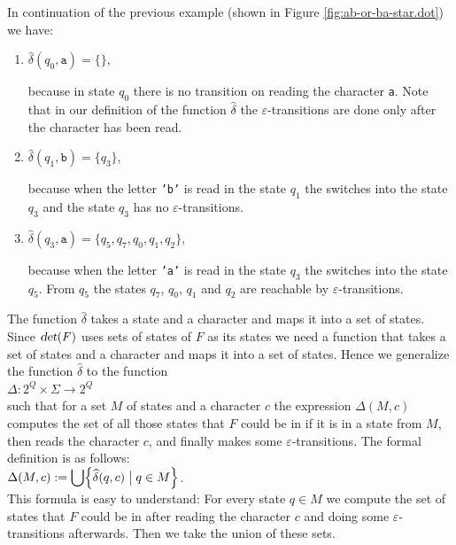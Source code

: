 \exampleEng
In continuation of the previous example (shown in Figure \ref{fig:ab-or-ba-star.dot}) we have:
\begin{enumerate}
\item $\widehat{\delta}(q_0, \texttt{a}) = \{\}$,
  
      because in state $q_0$ there is no transition on reading the character \texttt{a}.
      Note that in our definition of the function  $\widehat{\delta}$ the 
      $\varepsilon$-transitions are done only after the character has been read.
\item $\widehat{\delta}(q_1, \texttt{b}) = \{q_3\}$,

      because when the letter \texttt{'b'} is read in the state $q_1$ the 
      switches into the state $q_3$ and the state $q_3$ has no  $\varepsilon$-transitions.
\item $\widehat{\delta}(q_3, \texttt{a}) = \{q_5, q_7, q_0, q_1, q_2\}$,

      because when the letter \texttt{'a'} is read in the state $q_3$ the 
      switches into the state $q_5$.  From $q_5$ the states $q_7$, $q_0$, $q_1$ and $q_2$
      are reachable by $\varepsilon$-transitions. \eox
\end{enumerate}
The function  $\widehat{\delta}$ takes a state and a character and maps it into a set of states.  Since  $\textsl{det}(F)$ uses
sets of states of $F$ as its states we need a function that takes a set of states and a character and maps it
into a set of states.
Hence we generalize the function $\widehat{\delta}$ to the function
\\[0.2cm]
\hspace*{1.3cm}
$\Delta: 2^Q \times \Sigma \rightarrow 2^Q$
\\[0.2cm]
such that for a set $M$ of states and a character $c$ the expression $\Delta(M, c)$
computes the set of all those states that $F$ could be in if it is in a state from $M$, then
reads the character $c$, and finally makes some $\varepsilon$-transitions.
The formal definition is as follows: 
\\[0.2cm]
\hspace*{1.3cm}
$\displaystyle \Delta(M,c) := \bigcup \Bigl\{ \widehat{\delta}(q,c) \bigm| q \in M \Bigr\}$. 
\\[0.2cm]
This formula is easy to understand:  For every state  $q \in M$ we compute the set of states that 
$F$ could be in after reading the character $c$ and doing some 
$\varepsilon$-transitions afterwards.  Then we take the union of these sets.

